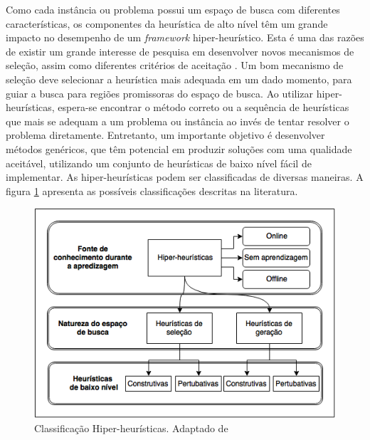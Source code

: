 Como cada instância ou problema possui um espaço de busca com diferentes características, os componentes da heurística de alto nível têm um grande impacto no desempenho de um \textit{framework} hiper-heurístico. Esta é uma das razões de existir um grande interesse de pesquisa em desenvolver  novos mecanismos de seleção, assim como diferentes critérios de aceitação \cite{burke2013hyper}. Um bom mecanismo de seleção deve selecionar a heurística mais adequada em um dado momento, para guiar a busca para regiões promissoras do espaço de busca. 
Ao utilizar hiper-heurísticas, espera-se encontrar o método correto ou a sequência de heurísticas que mais se adequam a um problema ou instância ao invés de tentar resolver o problema diretamente. Entretanto, um importante objetivo é desenvolver métodos genéricos, que têm  potencial em produzir soluções com uma qualidade aceitável, utilizando um conjunto de heurísticas de baixo nível fácil de implementar. As hiper-heurísticas podem ser classificadas de diversas maneiras. A figura \ref{img:classificacaoHiperHeuristicas} apresenta as possíveis classificações descritas na literatura. 

\begin{figure}[!htb]
	\centering
	\includegraphics[scale=0.8]{Imagens/ClassificacaoHiperHeuristica.png}
	\caption{Classificação Hiper-heurísticas. Adaptado de \cite{sabar2015automatic}}
	\label{img:classificacaoHiperHeuristicas}
\end{figure}

